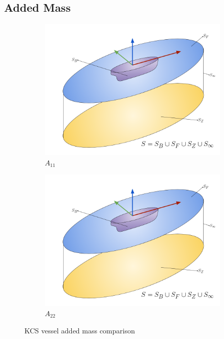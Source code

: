 \subsection{Added Mass}
\begin{figure}
    \centering
    \begin{subfigure}[b]{0.45\textwidth}
        \includegraphics[width=\textwidth]{photos/boundary_surfaces.png}
        \caption{$A_{11}$}
    \end{subfigure}
    \begin{subfigure}[b]{0.45\textwidth}
        \includegraphics[width=\textwidth]{photos/boundary_surfaces.png}
        \caption{$A_{22}$}
    \end{subfigure}
    \caption{KCS vessel added mass comparison}
    \label{fig:kcs_addedmass}
\end{figure}
